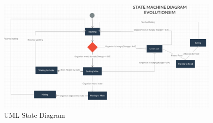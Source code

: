 \documentclass[a4paper, oneside, 11pt]{report}
\begin{document}
{\begin{figure}[H]
	\caption{UML State Diagram}\label{state-diagram}
	\centering
	\includegraphics[width=1\textwidth]{state-diagram}
\end{figure}

}
\end{document}
